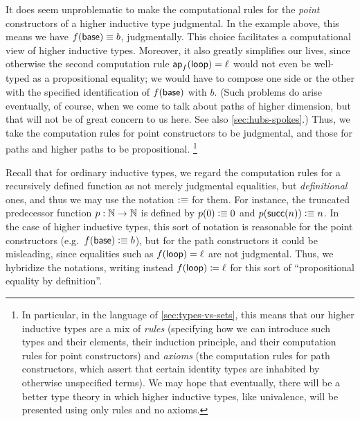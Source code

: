 It does seem unproblematic to make the computational rules for the \emph{point} constructors of a higher inductive type judgmental.
In the example above, this means we have $f(\mathsf{base})\equiv b$, judgmentally.
This choice facilitates a computational view of higher inductive types.
Moreover, it also greatly simplifies our lives, since otherwise the second computation rule $\mathsf{ap}_{f} (\mathsf{loop}) = \ell$ would not even be well-typed as a propositional equality; we would have to compose one side or the other with the specified identification of $f(\mathsf{base})$ with $b$.
(Such problems do arise eventually, of course, when we come to talk about paths of higher dimension, but that will not be of great concern to us here.
See also \cref{sec:hubs-spokes}.)
Thus, we take the computation rules for point constructors to be judgmental, and those for paths and higher paths to be propositional.%
\footnote{In particular, in the language of \cref{sec:types-vs-sets}, this means that our higher inductive types are a mix of \emph{rules} (specifying how we can introduce such types and their elements, their induction principle, and their computation rules for point constructors) and \emph{axioms} (the computation rules for path constructors, which assert that certain identity types are inhabited by otherwise unspecified terms).
We may hope that eventually, there will be a better type theory in which higher inductive types, like univalence, will be presented using only rules and no axioms.%
%
%
}

\begin{rmk}\label{rmk:defid}
Recall that for ordinary inductive types, we regard the computation rules for a recursively defined function as not merely judgmental equalities, but \emph{definitional} ones, and thus we may use the notation $\vcentcolon\equiv$ for them.
For instance, the truncated predecessor function $p:\mathbb{N}\to\mathbb{N}$ is defined by $p(0)\vcentcolon\equiv 0$ and $p(\mathsf{succ}(n))\vcentcolon\equiv n$.
In the case of higher inductive types, this sort of notation is reasonable for the point constructors (e.g.\ $f(\mathsf{base})\vcentcolon\equiv b$), but for the path constructors it could be misleading, since equalities such as ${f}\mathopen{}\left({\mathsf{loop}}\right)\mathclose{} = \ell$ are not judgmental.
Thus, we hybridize the notations, writing instead ${f}\mathopen{}\left({\mathsf{loop}}\right)\mathclose{} \coloneqq \ell$ for this sort of ``propositional equality by definition''.
\end{rmk}
%
%

